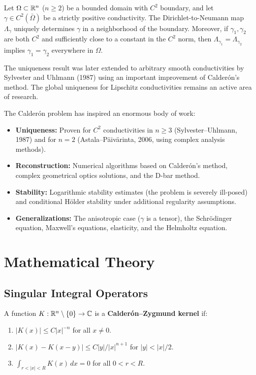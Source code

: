 \begin{theorem}
Let $\Omega \subset \mathbb{R}^n$ ($n \geq 2$) be a bounded domain with $C^2$ boundary, and let $\gamma \in C^2(\bar\Omega)$ be a strictly positive conductivity. The Dirichlet-to-Neumann map $\Lambda_\gamma$ uniquely determines $\gamma$ in a neighborhood of the boundary. Moreover, if $\gamma_1, \gamma_2$ are both $C^2$ and sufficiently close to a constant in the $C^2$ norm, then $\Lambda_{\gamma_1} = \Lambda_{\gamma_2}$ implies $\gamma_1 = \gamma_2$ everywhere in $\Omega$.
\end{theorem}

The uniqueness result was later extended to arbitrary smooth conductivities by Sylvester and Uhlmann (1987) using an important improvement of Calder\'{o}n's method. The global uniqueness for Lipschitz conductivities remains an active area of research.

The Calder\'{o}n problem has inspired an enormous body of work:
\begin{itemize}
    \item \textbf{Uniqueness:} Proven for $C^2$ conductivities in $n \geq 3$ (Sylvester--Uhlmann, 1987) and for $n = 2$ (Astala--P\"aiv\"arinta, 2006, using complex analysis methods).
    \item \textbf{Reconstruction:} Numerical algorithms based on Calder\'{o}n's method, complex geometrical optics solutions, and the D-bar method.
    \item \textbf{Stability:} Logarithmic stability estimates (the problem is severely ill-posed) and conditional H\"older stability under additional regularity assumptions.
    \item \textbf{Generalizations:} The anisotropic case ($\gamma$ is a tensor), the Schr\"odinger equation, Maxwell's equations, elasticity, and the Helmholtz equation.
\end{itemize}

\section{Mathematical Theory}

\subsection{Singular Integral Operators}

\begin{definition}
A function $K: \mathbb{R}^n \setminus \{0\} \to \mathbb{C}$ is a \textbf{Calder\'{o}n--Zygmund kernel} if:
\begin{enumerate}
    \item $|K(x)| \leq C|x|^{-n}$ for all $x \neq 0$.
    \item $|K(x) - K(x-y)| \leq C|y|/|x|^{n+1}$ for $|y| < |x|/2$.
    \item $\int_{r < |x| < R} K(x) \,dx = 0$ for all $0 < r < R$.
\end{enumerate}
\end{definition}


